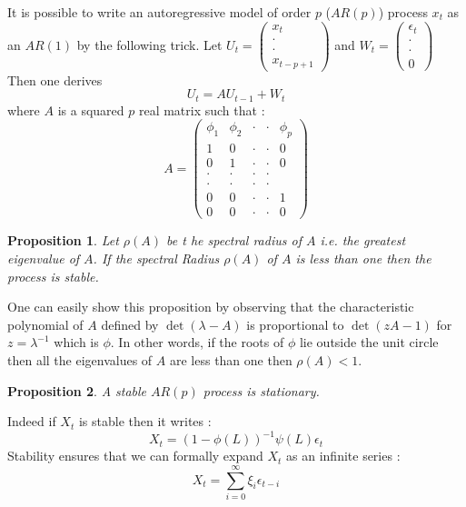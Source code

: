 \documentclass{article}
\newtheorem{Prop}{Proposition}[section]
\begin{document}
It is possible to write an autoregressive model of order $p$  ($AR(p)$) process $x_t$ as an $AR(1)$ by the following trick. Let $U_t=\begin{pmatrix} x_t\\
\cdot\\
\cdot\\
x_{t-p+1}
\end{pmatrix}$ and $W_t=\begin{pmatrix} \epsilon_t\\
\cdot\\
\cdot\\
0
\end{pmatrix}$ Then one derives \begin{equation}\label{VAR_ptoVAR_1}
    U_t=AU_{t-1}+W_t
\end{equation} where $A$ is a squared $p$ real matrix such that : \begin{equation*}
A=\begin{pmatrix} 
\phi_1 & \phi_2 & \cdot & \cdot & \phi_p \\
1  & 0 & \cdot & \cdot & 0\\
0 & 1 & \cdot & \cdot & 0 \\
\cdot & \cdot & \cdot & \cdot \\
\cdot & \cdot & \cdot & \cdot \\
0 & 0 & \cdot & \cdot & 1 \\
0 & 0 &  \cdot & \cdot & 0
\end{pmatrix}
\end{equation*}
\begin{Prop}
Let $\rho(A)$ be t he spectral radius of $A$ i.e. the greatest eigenvalue of $A$. If the spectral Radius $\rho(A)$ of $A$ is less than one then the process is stable.
\end{Prop}
One can easily show this proposition by observing that the characteristic polynomial of $A$ defined by $\det(\lambda -A)$ is proportional to $\det(zA-1)$ for $z=\lambda^{-1}$ which is $\phi$. In other words, if the roots of $\phi$ lie outside the unit circle then all the eigenvalues of $A$ are less than one then $\rho(A)<1$.
\begin{Prop}
A stable $AR(p)$ process is stationary.
\end{Prop}
Indeed if $X_t$ is stable then it writes : 
\begin{equation*}
    X_t=(1-\phi(L))^{-1}\psi(L)\epsilon_t
\end{equation*}
Stability ensures that we can formally expand $X_t$ as an infinite series : 
\begin{equation*}
    X_t=\sum_{i=0}^{\infty}\xi_i\epsilon_{t-i}
\end{equation*}
\end{document}
